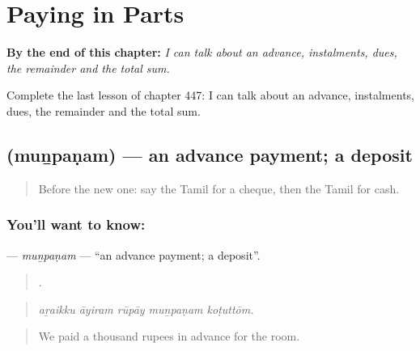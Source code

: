 
\chapter{Paying in Parts}
\label{ch:ta-paying-in-parts}

\begin{chapteropening}
\textbf{By the end of this chapter:} \emph{I can talk about an advance, instalments, dues, the remainder and the total sum.}

Complete the last lesson of chapter 447: I can talk about an advance, instalments, dues, the remainder and the total sum.
\end{chapteropening}

\section[\texorpdfstring{\ta{முன்பணம்} (muṉpaṇam)}{முன்பணம் (muṉpaṇam)}]{ (muṉpaṇam) — an advance payment; a deposit}

\label{lesson:TA-C447-munpanam}



\begin{quote}
Before the new one: say the Tamil for a cheque, then the Tamil for cash.
\end{quote}

\subsection*{You'll want to know: }
\textbf{} — \emph{muṉpaṇam} — \textquotedblleft{}an advance payment; a deposit\textquotedblright{}.

\begin{quote}
    .
\end{quote}

\begin{quote}
\emph{aṟaikku āyiram rūpāy muṉpaṇam koṭuttōm.}
\end{quote}

\begin{quote}
We paid a thousand rupees in advance for the room.
\end{quote}

